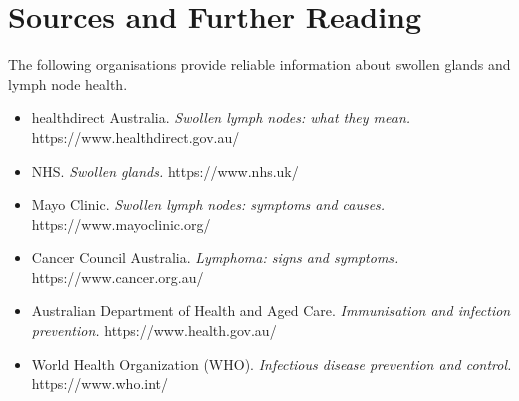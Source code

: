 \section*{Sources and Further Reading}
The following organisations provide reliable information about swollen glands and lymph node health.

\begin{itemize}
    \item healthdirect Australia. \textit{Swollen lymph nodes: what they mean.} https://www.healthdirect.gov.au/
    \item NHS. \textit{Swollen glands.} https://www.nhs.uk/
    \item Mayo Clinic. \textit{Swollen lymph nodes: symptoms and causes.} https://www.mayoclinic.org/
    \item Cancer Council Australia. \textit{Lymphoma: signs and symptoms.} https://www.cancer.org.au/
    \item Australian Department of Health and Aged Care. \textit{Immunisation and infection prevention.} https://www.health.gov.au/
    \item World Health Organization (WHO). \textit{Infectious disease prevention and control.} https://www.who.int/
\end{itemize}

\clearpage
